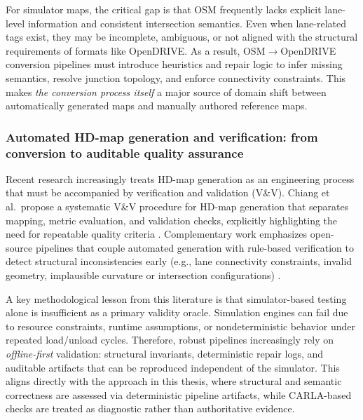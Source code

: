 For simulator maps, the critical gap is that OSM frequently lacks explicit lane-level information and consistent intersection semantics. Even when lane-related tags exist, they may be incomplete, ambiguous, or not aligned with the structural requirements of formats like OpenDRIVE. As a result, OSM$\rightarrow$OpenDRIVE conversion pipelines must introduce heuristics and repair logic to infer missing semantics, resolve junction topology, and enforce connectivity constraints. This makes \emph{the conversion process itself} a major source of domain shift between automatically generated maps and manually authored reference maps.

\subsubsection{Automated HD-map generation and verification: from conversion to auditable quality assurance}
Recent research increasingly treats HD-map generation as an engineering process that must be accompanied by verification and validation (V\&V). Chiang et al.\ propose a systematic V\&V procedure for HD-map generation that separates mapping, metric evaluation, and validation checks, explicitly highlighting the need for repeatable quality criteria \cite{chiang2022hdmapvv}. Complementary work emphasizes open-source pipelines that couple automated generation with rule-based verification to detect structural inconsistencies early (e.g., lane connectivity constraints, invalid geometry, implausible curvature or intersection configurations) \cite{opendrive_lanelet2_vv_2023}.

A key methodological lesson from this literature is that simulator-based testing alone is insufficient as a primary validity oracle. Simulation engines can fail due to resource constraints, runtime assumptions, or nondeterministic behavior under repeated load/unload cycles. Therefore, robust pipelines increasingly rely on \emph{offline-first} validation: structural invariants, deterministic repair logs, and auditable artifacts that can be reproduced independent of the simulator. This aligns directly with the approach in this thesis, where structural and semantic correctness are assessed via deterministic pipeline artifacts, while CARLA-based checks are treated as diagnostic rather than authoritative evidence.

